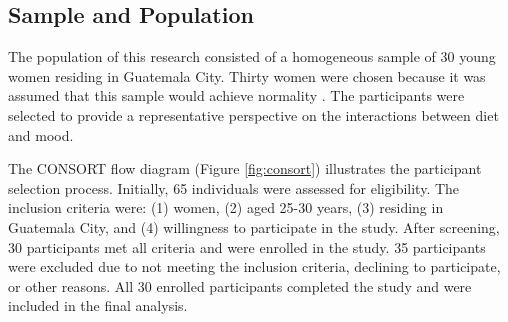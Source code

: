 \documentclass[jou]{apa7}
\begin{document}

\subsection{Sample and Population}\label{muestra-y-poblaciuxf3n}

The population of this research consisted of a homogeneous sample of 30 young women residing in Guatemala City. Thirty women were chosen because it was assumed that this sample would achieve normality \parencite{Hernandez2018}. The participants were selected to provide a representative perspective on the interactions between diet and mood.

The CONSORT flow diagram (Figure \ref{fig:consort}) illustrates the participant selection process. Initially, 65 individuals were assessed for eligibility. The inclusion criteria were: (1) women, (2) aged 25-30 years, (3) residing in Guatemala City, and (4) willingness to participate in the study. After screening, 30 participants met all criteria and were enrolled in the study. 35 participants were excluded due to not meeting the inclusion criteria, declining to participate, or other reasons. All 30 enrolled participants completed the study and were included in the final analysis.
\end{document}
